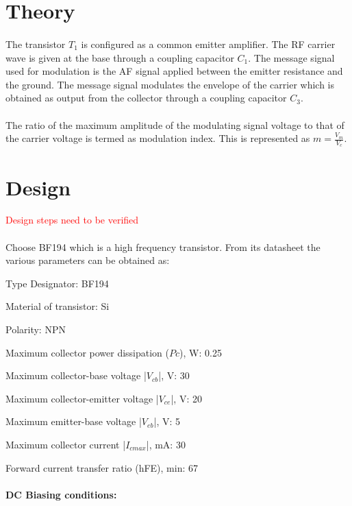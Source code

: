 \documentclass{book}
\begin{document}
\section*{Theory}
\paragraph{}
	The transistor $T_1$ is configured as a common emitter amplifier. The RF carrier wave is given at the base through a coupling capacitor $C_1$.  The message signal used for modulation is the AF signal applied between the emitter resistance and the ground. The message signal modulates the envelope of the carrier which is obtained as output from the collector through a coupling capacitor $C_3$. 
\paragraph{}
The ratio of the maximum amplitude of the modulating signal voltage to that of the carrier voltage is termed as modulation index. This is represented as $m=\frac{V_m}{V_c}$.


\section*{Design}
\textcolor{red}{Design steps need to be verified}
\paragraph{}
Choose BF194 which is a high frequency transistor. From its datasheet the various parameters can be obtained as:

  Type Designator: BF194

Material of transistor: Si

Polarity: NPN

Maximum collector power dissipation ($Pc$), W: 0.25

Maximum collector-base voltage |$V_{cb}$|, V: 30

Maximum collector-emitter voltage |$V_{ce}$|, V: 20

Maximum emitter-base voltage |$V_{eb}$|, V: 5

Maximum collector current |$I_{c max}$|, mA: 30

Forward current transfer ratio (hFE), min: 67

\paragraph{DC Biasing conditions:}
\end{document}
